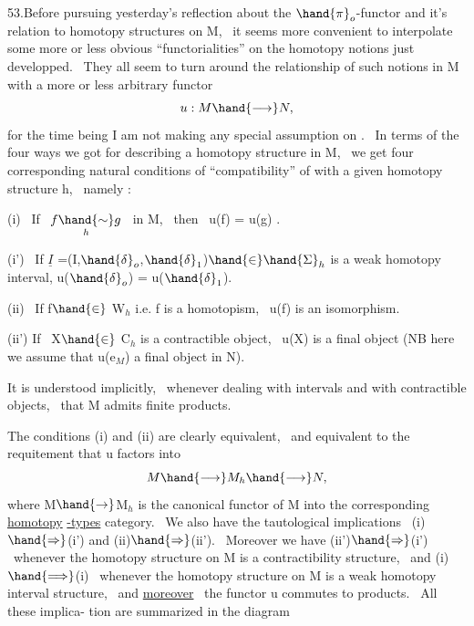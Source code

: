
53.\quad Before pursuing yesterday's reflection about the $\hand{\pi}_o$-functor and
it's relation to homotopy structures on M, \ it seems more convenient to
interpolate  some more or less obvious ``functorialities'' on
the homotopy notions just developped. \ They all seem to turn around the
relationship of such notions in M with a more or less arbitrary functor
\[ u : M \hand{\longrightarrow} N , \]
for the time being I am not making any special assumption on . \ In terms
of the four ways we got for describing a homotopy structure in M, \ we get
four corresponding natural conditions of ``compatibility'' of  with a
given homotopy structure h, \ namely :

(i) \ If \ $f \underset{h}{\hand{\sim}} g$ \ in M,  \ then \ u(f) = u(g) .

(i') \ If $\underline{I}$ =(I,$\hand{\delta}_o$,$\hand{\delta}_1$)$\hand{\in}\hand{\Sigma}_h$ is a weak homotopy interval,  u($\hand{\delta}_o$) = u($\hand{\delta}_1$).

(ii) \ If f$\hand{\in}$ W$_h$ i.e. f is a homotopism, \ u(f) is an isomorphism.

(ii') If \ X$\hand{\in}$ C$_h$ is a contractible object, \ u(X) is a final object (NB
here we assume that u(e$_M$)  a final object in N).

It is understood implicitly, \ whenever dealing with intervals and with
contractible  objects, \ that M admits finite products.\hand{)}

The conditions (i) and (ii) are clearly equivalent, \ and equivalent
to the requitement that u factors into
\[ M\hand{\longrightarrow} M_h \hand{\longrightarrow} N , \]
where M$\hand{\rightarrow}$M$_h$ is the canonical functor of M into the corresponding \uline{homotopy}
\uline{-types} category. \ We also have the tautological implications \ (i)$\hand{\Rightarrow}$(i')
and (ii)$\hand{\Rightarrow}$(ii'). \ Moreover we have (ii')$\hand{\Rightarrow}$(i') \ whenever the homotopy
structure on M is a contractibility structure, \ and (i)$\hand{\Longrightarrow}$(i) \ whenever
the homotopy structure on M is a weak homotopy interval structure, \ and
\uline{moreover} \ the functor u commutes to  products. \ All these implica-%
tion are summarized in the diagram
\margin{$*$}

